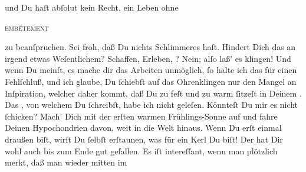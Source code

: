                und Du haſt abſolut kein Recht, ein Leben ohne \begin{otherlanguage}{french}\textsc{embétement}\end{otherlanguage} zu beanſpruchen. Sei froh, daß Du nichts Schlimmeres haſt. Hindert Dich
               das an irgend etwas Weſentlichem? Schaffen, Erleben, \label{K_L02839-12v}\label{K_L02839-12h}? Nein;
               alſo laß’ \strikeout{\textcolor{gray}{×}} es klingen! Und wenn Du meinſt, es mache dir das Arbeiten unmöglich, ſo  halte ich das für einen Fehlſchluß, und ich
               glaube, Du ſchiebſt auf das Ohrenklingen nur \strikeout{\textcolor{gray}{en}} den  Mangel an Inſpiration, welcher daher
               kommt, daß Du zu feſt und zu warm ſitzeſt in Deinem \label{K_L02839-14v}\label{K_L02839-14h}.\pend
           \pstart
           {\pb}Das \label{K_L02839-5v}\label{K_L02839-5h}, von welchem Du ſchreibſt, habe ich nicht geleſen. Könnteſt Du mir es
               nicht ſchicken?\pend
           \pstart
           Mach’ Dich mit der erſten warmen Frühlings-Sonne auf und fahre Deinen Hypochondrien
               davon, weit in die Welt hinaus. Wenn Du erſt einmal draußen biſt, wirſt Du ſelbſt
               erſtaunen, was für ein Kerl Du biſt!\pend
           \pstart
           Der \label{K_L02839-11v}\label{K_L02839-11h} hat Dir wohl auch bis zum Ende gut gefallen. Es iſt intereſſant,  wenn man plötzlich merkt, daß man wieder mitten im
